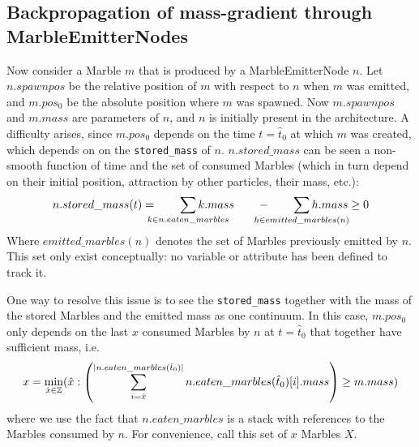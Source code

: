 \subsection{Backpropagation of mass-gradient through MarbleEmitterNodes}
Now consider a Marble $m$ that is produced by a MarbleEmitterNode $n$. Let $n.spawnpos$ be the relative position of $m$ with respect to $n$ when $m$ was emitted, and $m.pos_0$ be the absolute position where $m$ was spawned. Now $m.spawnpos$ and $m.mass$ are parameters of $n$, and $n$ is initially present in the architecture. 
A difficulty arises, since $m.pos_0$ depends on the time $t = \hat{t}_0$ at which $m$ was created, which depends on on the \texttt{stored\_mass} of $n$. 
$n.stored\_mass$ can be seen a non-smooth function of time and the set of consumed Marbles
(which in turn depend on their initial position, attraction by other particles, their mass, etc.):
\begin{equation}
    n.stored\_mass(t) = \qquad \smashoperator{\sum_{k \in n.eaten\_marbles}} k.mass \qquad - \qquad \smashoperator{\sum_{h \in emitted\_marbles(n)}} h.mass \geq 0
\end{equation}
Where $emitted\_marbles(n)$ denotes the set of Marbles previously emitted by $n$. 
This set only exist conceptually: no variable or attribute has been defined to track it.


One way to resolve this issue is to see the \texttt{stored\_mass} 
together with the mass of the stored Marbles and the emitted mass as one continuum. 
In this case, $m.pos_0$ only depends on the last $x$ consumed Marbles by $n$ at $t = \hat{t}_0$ that together have sufficient mass, i.e.
\begin{equation}
    x = \min_{\hat{x} \in \mathbb{Z}} (\hat{x} : \left(\sum_{i = \hat{x}}^{\lvert n.eaten\_marbles(\hat{t}_0) \rvert} n.eaten\_marbles(\hat{t}_0)[i].mass\right) \geq m.mass )
\end{equation}
where we use the fact that $n.eaten\_marbles$ is a stack with references to the Marbles consumed by $n$. For convenience, call this set of $x$ Marbles $X$.

